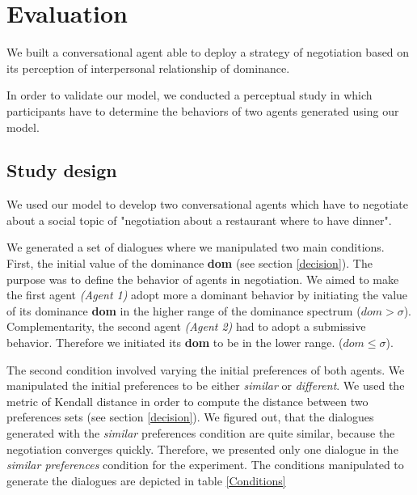 \documentclass{llncs}
\begin{document}
	
	
	\section{Evaluation}
	
	We built a conversational agent able to deploy a strategy of negotiation based on its perception of interpersonal relationship of dominance. 
	
	In order to validate our model, we conducted a perceptual study in which participants have to determine the behaviors of two agents generated using our model. 
	
	\subsection{Study design}
	We used our model to develop two conversational agents which have to negotiate about a social topic of "negotiation about a restaurant where to have dinner".
	
	We generated a set of dialogues where we manipulated two main conditions. First, the initial value of the dominance \textbf{dom} (see section \ref{decision}). The purpose was to define the behavior of agents in negotiation.
	We aimed to make the first agent \emph{(Agent 1)} adopt more a dominant behavior by initiating the value of its dominance \textbf{dom} in the higher range of the dominance spectrum ($dom>\sigma$). Complementarity, the second agent \emph{(Agent 2)} had to adopt a submissive behavior. Therefore we initiated its \textbf{dom} to be in the lower range. ($ dom\leq \sigma$).
	
	The second condition involved varying the initial preferences of both agents. We manipulated the initial preferences to be either \textit{similar} or \textit{different}. We used the metric of Kendall distance \cite{bra2013Kendall} in order to compute the distance between two preferences sets (see section \ref{decision}).  
	We figured out, that the dialogues generated with the \textit{similar} preferences condition are quite similar, because the negotiation converges quickly. Therefore, we presented only one dialogue in the \textit{similar preferences} condition for the experiment. 
	The conditions manipulated to generate the dialogues are depicted in table \ref{Conditions}
	
\end{document}
